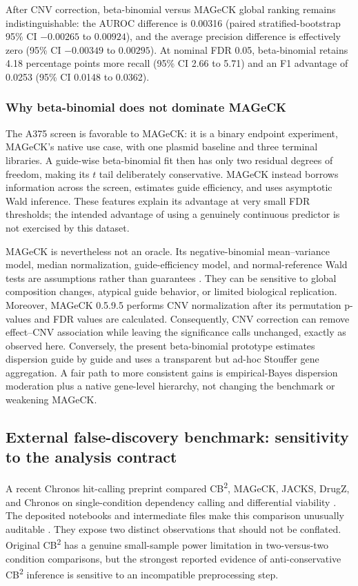 After CNV correction, beta-binomial versus MAGeCK global ranking remains
indistinguishable: the AUROC difference is 0.00316 (paired
stratified-bootstrap 95\% CI $-0.00265$ to $0.00924$), and the average
precision difference is effectively zero (95\% CI $-0.00349$ to $0.00295$).
At nominal FDR 0.05, beta-binomial retains 4.18 percentage points more recall
(95\% CI 2.66 to 5.71) and an F1 advantage of 0.0253 (95\% CI 0.0148 to
0.0362).

\subsubsection{Why beta-binomial does not dominate MAGeCK}

The A375 screen is favorable to MAGeCK: it is a binary endpoint experiment,
MAGeCK's native use case, with one plasmid baseline and three terminal
libraries.  A guide-wise beta-binomial fit then has only two residual degrees
of freedom, making its $t$ tail deliberately conservative.  MAGeCK instead
borrows information across the screen, estimates guide efficiency, and uses
asymptotic Wald inference.  These features explain its advantage at very small
FDR thresholds; the intended advantage of using a genuinely continuous
predictor is not exercised by this dataset.

MAGeCK is nevertheless not an oracle.  Its negative-binomial mean--variance
model, median normalization, guide-efficiency model, and normal-reference Wald
tests are assumptions rather than guarantees \citep{li2014mageck,li2015mageckvispr}.
They can be sensitive to global composition changes, atypical guide behavior,
or limited biological replication.  Moreover, MAGeCK 0.5.9.5 performs CNV
normalization after its permutation p-values and FDR values are calculated.
Consequently, CNV correction can remove effect--CNV association while leaving
the significance calls unchanged, exactly as observed here.  Conversely, the present beta-binomial
prototype estimates dispersion guide by guide and uses a transparent but
ad-hoc Stouffer gene aggregation.  A fair path to more consistent gains is
empirical-Bayes dispersion moderation plus a native gene-level hierarchy, not
changing the benchmark or weakening MAGeCK.

\subsection{External false-discovery benchmark: sensitivity to the analysis contract}

A recent Chronos hit-calling preprint compared CB\textsuperscript{2},
MAGeCK, JACKS, DrugZ, and Chronos on single-condition dependency calling and
differential viability \citep{dempster2025fdr}.  The deposited notebooks and
intermediate files make this comparison unusually auditable
\citep{dempster2025fdrdata}.  They expose two distinct observations that
should not be conflated.  Original CB\textsuperscript{2} has a genuine
small-sample power limitation in two-versus-two condition comparisons, but
the strongest reported evidence of anti-conservative CB\textsuperscript{2}
inference is sensitive to an incompatible preprocessing step.

